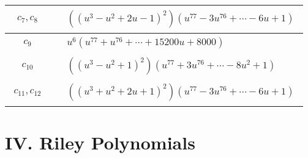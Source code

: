 \documentclass[1p]{elsarticle_modified}
\theoremstyle{definition}
\begin{document}
\begin{tabular}{m{50pt}|m{274pt}}
\hline $$\begin{aligned}c_{7},c_{8}\end{aligned}$$&$\begin{aligned}
&((u^3- u^2+2 u-1)^2)(u^{77}-3 u^{76}+\cdots-6 u+1)
\end{aligned}$\\
\hline $$\begin{aligned}c_{9}\end{aligned}$$&$\begin{aligned}
&u^6(u^{77}+u^{76}+\cdots+15200 u+8000)
\end{aligned}$\\
\hline $$\begin{aligned}c_{10}\end{aligned}$$&$\begin{aligned}
&((u^3- u^2+1)^2)(u^{77}+3 u^{76}+\cdots-8 u^2+1)
\end{aligned}$\\
\hline $$\begin{aligned}c_{11},c_{12}\end{aligned}$$&$\begin{aligned}
&((u^3+u^2+2 u+1)^2)(u^{77}-3 u^{76}+\cdots-6 u+1)
\end{aligned}$\\
\hline
\end{tabular}\newpage\renewcommand{\arraystretch}{1}
\centering \section*{ IV. Riley Polynomials}
\end{document}
